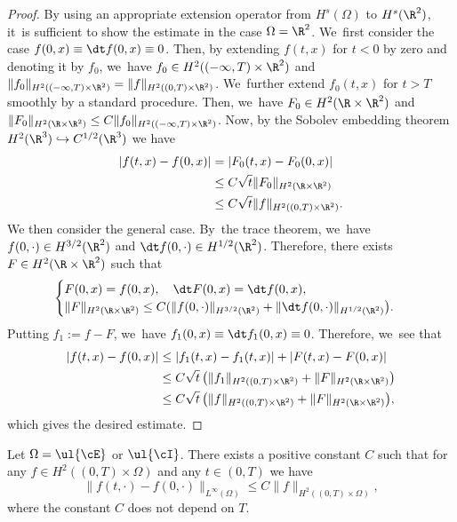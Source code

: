 \begin{proof}
By using an appropriate extension operator from $H^s(\Omega)$ to $H^s(\R^2)$, it~is sufficient to show the estimate in the case $\Omega=\R^2$. We~first consider the case $f(0,x)\equiv \dt f(0,x)\equiv0$.
Then, by extending $f(t,x)$ for $t<0$ by zero and denoting it by $f_0$, we~have $f_0\in H^2((-\infty,T)\times\R^2)$ and $\|f_0\|_{H^2((-\infty,T)\times\R^2)}=\|f\|_{H^2((0,T)\times\R^2)}$. We~further extend $f_0(t,x)$ for $t>T$ smoothly by a standard procedure.
Then, we~have $F_0\in H^2(\R\times\R^2)$ and
$\|F_0\|_{H^2(\R\times\R^2)} \leq C\|f_0\|_{H^2((-\infty,T)\times\R^2)}$.
Now, by the Sobolev embedding theorem $H^2(\R^3) \hookrightarrow C^{1/2}(\R^3)$ we have
\begin{align*}
|f(t,x)-f(0,x)|
&= |F_0(t,x)-F_0(0,x)| \\
&\leq C\sqrt{t}\|F_0\|_{H^2(\R\times\R^2)} \\
&\leq C\sqrt{t}\|f\|_{H^2((0,T)\times\R^2)}.
\end{align*}
We then consider the general case. By~the trace theorem, we~have $f(0,\cdot) \in H^{3/2}(\R^2)$ and $\dt f(0,\cdot) \in H^{1/2}(\R^2)$.
Therefore, there exists $F\in H^2(\R\times\R^2)$ such that
\[
\begin{cases}
F(0,x)=f(0,x), \quad \dt F(0,x)=\dt f(0,x), \\
\|F\|_{H^2(\R\times\R^2)}
\leq C(\|f(0,\cdot)\|_{H^{3/2}(\R^2)} + \|\dt f(0,\cdot)\|_{H^{1/2}(\R^2)} \bigr).
\end{cases}
\]
Putting $f_1:=f-F$, we~have $f_1(0,x)\equiv \dt f_1(0,x)\equiv0$.
Therefore, we~see that
\begin{align*}
|f(t,x)-f(0,x)|
&\leq |f_1(t,x)-f_1(t,x)| + |F(t,x)-F(0,x)| \\
&\leq C\sqrt{t}\, \bigl(\|f_1\|_{H^2((0,T)\times\R^2)} + \|F\|_{H^2(\R\times\R^2)} \bigr) \\
&\leq C\sqrt{t}\, \bigl(\|f\|_{H^2((0,T)\times\R^2)} + \|F\|_{H^2(\R\times\R^2)} \bigr),
\end{align*}
which gives the desired estimate.
\end{proof}

\begin{lemma}\label{lem:Embedding2}
Let $\Omega=\ul{\cE}$ or $\ul{\cI}$.
There exists a positive constant $C$ such that for any $f\in H^2((0,T)\times\Omega)$
and any $t\in(0,T)$ we have
\[
\|f(t,\cdot)-f(0,\cdot)\|_{L^\infty(\Omega)} \leq C \|f\|_{H^2((0,T)\times\Omega)},
\]
where the constant $C$ does not depend on $T$.
\end{lemma}

